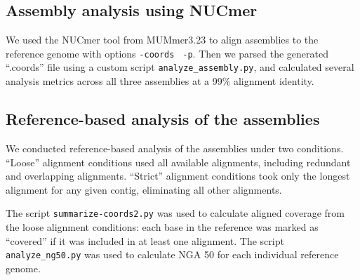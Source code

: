 \documentclass[11pt]{article}
\begin{document}




\subsection*{Assembly analysis using NUCmer}

We used the NUCmer tool from MUMmer3.23 \cite{mummer3.0} to align
assemblies to the reference genome with options {\tt \--coords} {\tt
  -p}. Then we parsed the generated ``.coords'' file using a custom
script {\tt{analyze\_assembly.py}}, and calculated several analysis
metrics across all three assemblies at a 99\% alignment identity.

\subsection*{Reference-based analysis of the assemblies}

We conducted reference-based analysis of the assemblies under two
conditions.  ``Loose'' alignment conditions used all available
alignments, including redundant and overlapping alignments. ``Strict''
alignment conditions took only the longest alignment for any given
contig, eliminating all other alignments.

The script {\tt summarize-coords2.py} was used to calculate aligned
coverage from the loose alignment conditions: each base in the reference
was marked as ``covered'' if it was included in at least one alignment.
The script {\tt analyze\_ng50.py} was used to calculate NGA 50 for
each individual reference genome.
\end{document}

